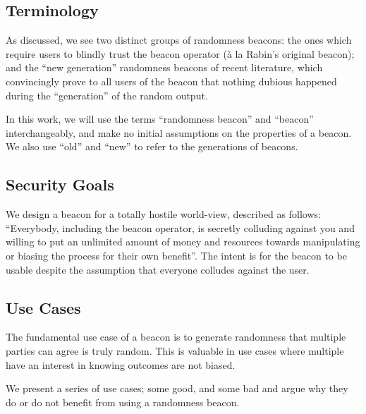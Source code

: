 \subsection{Terminology}
As discussed, we see two distinct groups of randomness beacons: the ones which require users to blindly trust the beacon operator (à la Rabin's original beacon); and the \enquote{new generation} randomness beacons of recent literature, which convincingly prove to all users of the beacon that nothing dubious happened during the \enquote{generation} of the random output.

In this work, we will use the terms \enquote{randomness beacon} and \enquote{beacon} interchangeably, and make no initial assumptions on the properties of a beacon. We also use \enquote{old} and \enquote{new} to refer to the generations of beacons.

\subsection{Security Goals}
We design a beacon for a totally hostile world-view, described as follows:
\enquote{Everybody, including the beacon operator, is secretly colluding against you and willing to put an unlimited amount of money and resources towards manipulating or biasing the process for their own benefit}.
The intent is for the beacon to be usable despite the assumption that everyone colludes against the user.

\subsection{Use Cases}

The fundamental use case of a beacon is to generate randomness that multiple parties can agree is truly random. This is valuable in use cases where multiple have an interest in knowing outcomes are not biased.

We present a series of use cases; some good, and some bad and argue why they do or do not benefit from using a randomness beacon.

